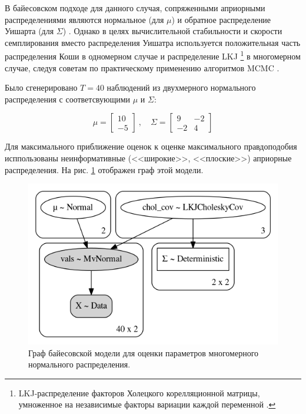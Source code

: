 \documentclass[a4paper,14pt]{extreport}
\begin{document}
В байесовском подходе для данного случая, сопряженными априорными распределениями являются нормальное (для $\mu$) и обратное распределение Уишарта (для $\Sigma$) \cite{stan_user_guide}. Однако в целях вычислительной стабильности и скорости семплирования вместо распределения Уишатра используется положительная часть распределения Коши в одномерном случае и распределение LKJ \cite{lkj_prior} \footnote{LKJ-распределение факторов Холецкого корелляционной матрицы, умноженное на независимые факторы вариации каждой переменной \cite{lkj_prior}. } в многомерном случае, следуя советам по практическому применению алгоритмов MCMC \cite{stan_user_guide}.

Было сгенерировано $T=40$ наблюдений из двухмерного нормального распределения с соответсвующими $\mu$ и $\Sigma$:

\begin{equation}
	\mu = 
	\begin{bmatrix}
		10 \\
		-5
	\end{bmatrix}
	\	, \quad
	\Sigma = 
	\begin{bmatrix} 
		9  & -2 \\
		-2 & 4 
	\end{bmatrix}
\end{equation}

Для максимального приближение оценок к оценке максимального правдоподобия исппользованы неинформативные (<<широкие>>, <<плоские>>) априорные распределения. На рис. \ref{fig:pp_mvn_graph} отображен граф этой модели.

\begin{figure}[H]
	\includegraphics[width=\linewidth]{img/gen/pp_mvn_graph.png}
	\caption{Граф байесовской модели для оценки параметров многомерного нормального распределения. }
	\label{fig:pp_mvn_graph}
\end{figure}
\end{document}
